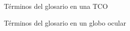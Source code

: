 \begin{figure}[H]
  \caption{Términos del glosario en una TCO}
  \centering \setlength\fboxsep{0pt} \setlength\fboxrule{0.5pt}
\end{figure}

\begin{figure}[H]
  \caption{Términos del glosario en un globo ocular}
  \centering \setlength\fboxsep{0pt} \setlength\fboxrule{0.5pt}
\end{figure}